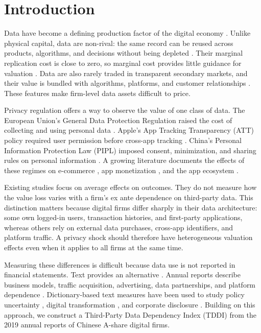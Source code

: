 \section{Introduction}
\label{sec:intro}

Data have become a defining production factor of the digital economy \cite{jones2020}. Unlike physical capital, data are non-rival: the same record can be reused across products, algorithms, and decisions without being depleted \cite{farboodi2020}. Their marginal replication cost is close to zero, so marginal cost provides little guidance for valuation \cite{bergemann2019}. Data are also rarely traded in transparent secondary markets, and their value is bundled with algorithms, platforms, and customer relationships \cite{oecd2022}. These features make firm-level data assets difficult to price.

Privacy regulation offers a way to observe the value of one class of data. The European Union's General Data Protection Regulation raised the cost of collecting and using personal data \cite{goldberg2024}. Apple's App Tracking Transparency (ATT) policy required user permission before cross-app tracking \cite{apple2020}. China's Personal Information Protection Law (PIPL) imposed consent, minimization, and sharing rules on personal information \cite{pipl2021}. A growing literature documents the effects of these regimes on e-commerce \cite{aridor2024}, app monetization \cite{kesler2023}, and the app ecosystem \cite{cheyre2024}.

Existing studies focus on average effects on outcomes. They do not measure how the value loss varies with a firm's ex ante dependence on third-party data. This distinction matters because digital firms differ sharply in their data architecture: some own logged-in users, transaction histories, and first-party applications, whereas others rely on external data purchases, cross-app identifiers, and platform traffic. A privacy shock should therefore have heterogeneous valuation effects even when it applies to all firms at the same time.

Measuring these differences is difficult because data use is not reported in financial statements. Text provides an alternative \cite{gentzkow2019}. Annual reports describe business models, traffic acquisition, advertising, data partnerships, and platform dependence \cite{loughran2011}. Dictionary-based text measures have been used to study policy uncertainty \cite{baker2016}, digital transformation \cite{jin2026}, and corporate disclosure \cite{loughran2011}. Building on this approach, we construct a Third-Party Data Dependency Index (TDDI) from the 2019 annual reports of Chinese A-share digital firms.


